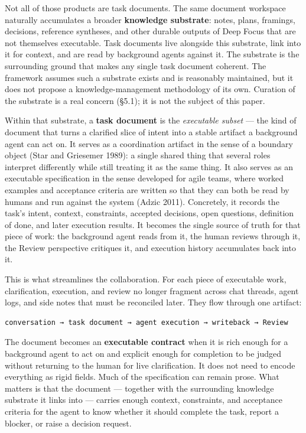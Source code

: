 \documentclass[
  nonatbib,
  preprint]{article}
\begin{document}
Not all of those products are task documents. The same document
workspace naturally accumulates a broader \textbf{knowledge substrate}:
notes, plans, framings, decisions, reference syntheses, and other
durable outputs of Deep Focus that are not themselves executable. Task
documents live alongside this substrate, link into it for context, and
are read by background agents against it. The substrate is the
surrounding ground that makes any single task document coherent. The
framework assumes such a substrate exists and is reasonably maintained,
but it does not propose a knowledge-management methodology of its own.
Curation of the substrate is a real concern (§5.1); it is not the
subject of this paper.

Within that substrate, a \textbf{task document} is the \emph{executable
subset} --- the kind of document that turns a clarified slice of intent
into a stable artifact a background agent can act on. It serves as a
coordination artifact in the sense of a boundary object (Star and
Griesemer 1989): a single shared thing that several roles interpret
differently while still treating it as the same thing. It also serves as
an executable specification in the sense developed for agile teams,
where worked examples and acceptance criteria are written so that they
can both be read by humans and run against the system (Adzic 2011).
Concretely, it records the task's intent, context, constraints, accepted
decisions, open questions, definition of done, and later execution
results. It becomes the single source of truth for that piece of work:
the background agent reads from it, the human reviews through it, the
Review perspective critiques it, and execution history accumulates back
into it.

This is what streamlines the collaboration. For each piece of executable
work, clarification, execution, and review no longer fragment across
chat threads, agent logs, and side notes that must be reconciled later.
They flow through one artifact:

\begin{verbatim}
conversation → task document → agent execution → writeback → Review
\end{verbatim}

The document becomes an \textbf{executable contract} when it is rich
enough for a background agent to act on and explicit enough for
completion to be judged without returning to the human for live
clarification. It does not need to encode everything as rigid fields.
Much of the specification can remain prose. What matters is that the
document --- together with the surrounding knowledge substrate it links
into --- carries enough context, constraints, and acceptance criteria
for the agent to know whether it should complete the task, report a
blocker, or raise a decision request.
\end{document}

